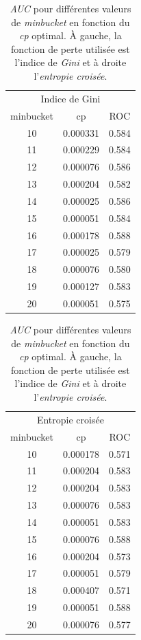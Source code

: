 \documentclass[]{article}
\begin{document}
\begin{table}[!ht]
\caption{\emph{AUC} pour différentes valeurs de \emph{minbucket} en fonction du 
\emph{cp} optimal. À gauche, la fonction de perte utilisée est l'indice de 
\emph{Gini} et à droite l'\emph{entropie croisée}.}
\label{tbl:tree.auc}
\begin{minipage}{0.48\linewidth}
\centering
\begin{tabular}{ccc}
\hline
\multicolumn{3}{c}{Indice de Gini} \\
minbucket & cp & ROC \\ 
  \hline
10 & 0.000331 & 0.584 \\ 
  11 & 0.000229 & 0.584 \\ 
  12 & 0.000076 & 0.586 \\ 
  13 & 0.000204 & 0.582 \\ 
  14 & 0.000025 & 0.586 \\ 
  15 & 0.000051 & 0.584 \\ 
   \hline
16 & 0.000178 & 0.588 \\ 
   \hline
17 & 0.000025 & 0.579 \\ 
  18 & 0.000076 & 0.580 \\ 
  19 & 0.000127 & 0.583 \\ 
  20 & 0.000051 & 0.575 \\ 
   \hline
\end{tabular}
\end{minipage}
\hfill
\begin{minipage}{0.48\linewidth}
\centering
\begin{tabular}{ccc}
\hline
\multicolumn{3}{c}{Entropie croisée} \\
minbucket & cp & ROC \\ 
  \hline
10 & 0.000178 & 0.571 \\ 
  11 & 0.000204 & 0.583 \\ 
  12 & 0.000204 & 0.583 \\ 
  13 & 0.000076 & 0.583 \\ 
  14 & 0.000051 & 0.583 \\ 
   \hline
15 & 0.000076 & 0.588 \\ 
   \hline
16 & 0.000204 & 0.573 \\ 
  17 & 0.000051 & 0.579 \\ 
  18 & 0.000407 & 0.571 \\ 
  19 & 0.000051 & 0.588 \\ 
  20 & 0.000076 & 0.577 \\ 
   \hline
\end{tabular}
\end{minipage}
\end{table}
\end{document}
